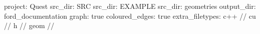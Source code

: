 project\+: Quest src\+\_\+dir\+: SRC src\+\_\+dir\+: EXAMPLE src\+\_\+dir\+: geometries output\+\_\+dir\+: ford\+\_\+documentation graph\+: true coloured\+\_\+edges\+: true extra\+\_\+filetypes\+: c++ // cu // h // geom // 
